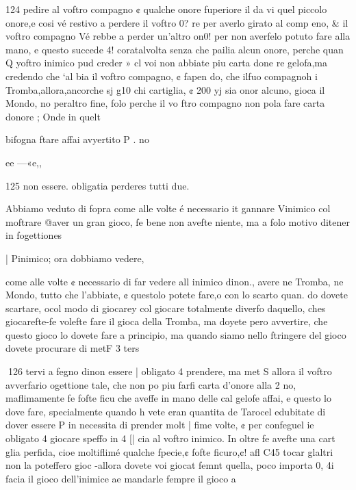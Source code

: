 \documentclass[12pt,a6paper]{article}
\begin{document}
 

 

 

 

 

 

 

 

 

 

 

124
pedire al voftro compagno ¢
qualche onore fuperiore il da
vi quel piccolo onore,e cosi vé
restivo a perdere il voftro 0?
re per averlo girato al comp
eno, & il voftro compagno Vé
rebbe a perder un’altro on0!
per non averfelo potuto fare
alla mano, e questo succede 4!
coratalvolta senza che pailia
alcun onore, perche quan Q
yoftro inimico pud creder » cl
voi non abbiate piu carta done
re gelofa,ma credendo che ‘al
bia il voftro compagno, ¢ fapen
do, che ilfuo compagnoh i
Tromba,allora,ancorche sj g10
chi cartiglia, ¢ 200 yj sia onor
alcuno, gioca il Mondo, no
peraltro fine, folo perche il vo
ftro compagno non pola fare
carta donore ; Onde in quelt

bifogna ftare affai avyertito P
. no

ee —«e,,
  

125
non essere. obligatia perderes
tutti due.

Abbiamo veduto di fopra come alle volte é necessario it
gannare Vinimico col moftrare
@aver un gran gioco, fe bene
non avefte niente, ma a folo
motivo ditener in fogettiones

| Pinimico; ora dobbiamo vedere,

come alle volte ¢ necessario di
far vedere all inimico dinon.,
avere ne Tromba, ne Mondo,
tutto che l’abbiate, ¢ questolo
potete fare,o con lo scarto quan.
do dovete scartare, ocol modo
di giocarey col giocare totalmente diverfo daquello, ches
giocarefte-fe volefte fare il gioca
della Tromba, ma doyete pero
avvertire, che questo gioco lo
dovete fare a principio, ma
quando siamo nello ftringere del
gioco dovete procurare di metF 3 ters

 

 

 
126
tervi a fegno dinon essere |
obligato 4 prendere, ma met
S allora il voftro avverfario
ogettione tale, che non po
piu farfi carta d’onore alla 2
no, maflimamente fe fofte ficu
che aveffe in mano delle cal
gelofe affai, e questo lo dove
fare, specialmente quando h
vete eran quantita de Tarocel
edubitate di dover essere P
in necessita di prender molt
|  fime volte, ¢ per confeguel
ie obligato 4 giocare speffo in 4
[| cia al voftro inimico.
In oltre fe avefte una cart
glia perfida, cioe moltiflimé
qualche fpecie,¢ fofte ficuro,¢!
afl C45 tocar
glaltri non la poteffero gioc
-allora dovete voi giocat femnt
quella, poco importa 0,
4i facia il gioco dell’inimice ae
mandarle fempre il gioco a
\end{document}
